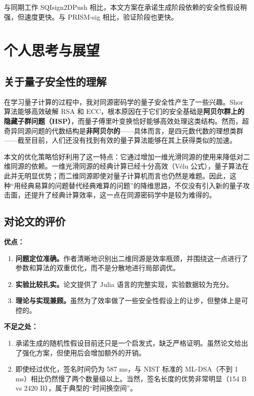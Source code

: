 \documentclass[12pt,a4paper]{ctexart}
\theoremstyle{remark}
\begin{document}
与同期工作 SQIsign2DPush 相比，本文方案在承诺生成阶段依赖的安全性假设稍强，但速度更快。与 PRISM-sig 相比，验证阶段也更快。

\section{个人思考与展望}

\subsection{关于量子安全性的理解}

在学习量子计算的过程中，我对同源密码学的量子安全性产生了一些兴趣。Shor 算法能够高效破解 RSA 和 ECC，根本原因在于它们的安全基础是\textbf{阿贝尔群上的隐藏子群问题（HSP）}，而量子傅里叶变换恰好能够高效处理这类结构。然而，超奇异同源问题的代数结构是\textbf{非阿贝尔的}——具体而言，是四元数代数的理想类群——截至目前，人们还没有找到有效的量子算法能够在其上获得类似的加速。

本文的优化策略恰好利用了这一特点：它通过增加一维光滑同源的使用来降低对二维同源的依赖。一维光滑同源的经典计算已经十分高效（V\'{e}lu 公式），量子算法在此并无明显优势；而二维同源即使对量子计算机而言也仍然是难题。因此，这种``用经典易算的问题替代经典难算的问题''的降维思路，不仅没有引入新的量子攻击面，还提升了经典计算效率，这一点在同源密码学中是较为难得的。

\subsection{对论文的评价}

\textbf{优点：}
\begin{enumerate}
  \item \textbf{问题定位准确。}作者清晰地识别出二维同源是效率瓶颈，并围绕这一点进行了参数和算法的双重优化，而不是分散地进行局部调优。
  \item \textbf{实验比较扎实。}论文提供了 Julia 语言的完整实现，实验数据较为充分。
  \item \textbf{理论与实现兼顾。}虽然为了效率做了一些安全性假设上的让步，但整体上是可控的。
\end{enumerate}

\textbf{不足之处：}
\begin{enumerate}
  \item 承诺生成的随机性假设目前还只是一个启发式，缺乏严格证明。虽然论文给出了强化方案，但使用后会增加额外的开销。
  \item 即使经过优化，签名时间仍为 587 ms，与 NIST 标准的 ML-DSA（不到 1 ms）相比仍然慢了两个数量级以上。当然，签名长度的优势非常明显（154 B vs 2420 B），属于典型的``时间换空间''。
\end{enumerate}
\end{document}

